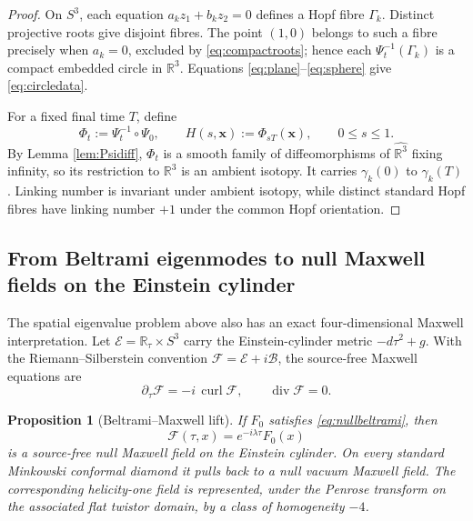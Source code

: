 \documentclass[aps,prd,reprint,nofootinbib,superscriptaddress]{revtex4-2}
\newtheorem{proposition}[theorem]{Proposition}
\theoremstyle{definition}
\theoremstyle{remark}
\newcommand{\R}{\mathbb{R}}
\newcommand{\Div}{\operatorname{div}}
\newcommand{\Curl}{\operatorname{curl}}
\begin{document}
\begin{proof}
On $S^3$, each equation $a_kz_1+b_kz_2=0$ defines a Hopf fibre $\Gamma_k$. Distinct projective roots give disjoint fibres. The point $(1,0)$ belongs to such a fibre precisely when $a_k=0$, excluded by \eqref{eq:compactroots}; hence each $\Psi_t^{-1}(\Gamma_k)$ is a compact embedded circle in $\R^3$. Equations \eqref{eq:plane}--\eqref{eq:sphere} give \eqref{eq:circledata}.

For a fixed final time $T$, define
\begin{equation}
\Phi_t:=\Psi_t^{-1}\circ\Psi_0,
\qquad
H(s,\mathbf x):=\Phi_{sT}(\mathbf x),
\qquad 0\le s\le1.
\label{eq:ambient}
\end{equation}
By Lemma \ref{lem:Psidiff}, $\Phi_t$ is a smooth family of diffeomorphisms of $\widehat{\R^3}$ fixing infinity, so its restriction to $\R^3$ is an ambient isotopy. It carries $\gamma_k(0)$ to $\gamma_k(T)$. Linking number is invariant under ambient isotopy, while distinct standard Hopf fibres have linking number $+1$ under the common Hopf orientation.
\end{proof}


\subsection{From Beltrami eigenmodes to null Maxwell fields on the Einstein cylinder}
\label{subsec:beltramiMaxwell}

The spatial eigenvalue problem above also has an exact four-dimensional Maxwell interpretation.  Let
\(\mathcal E=\mathbb R_\tau\times S^3\) carry the Einstein-cylinder metric
\(-d\tau^2+g\).  With the Riemann--Silberstein convention
\(\mathcal F=\mathcal E+i\mathcal B\), the source-free Maxwell equations are
\begin{equation}
 \partial_\tau\mathcal F=-i\,\Curl\mathcal F,
 \qquad \Div\mathcal F=0.
\label{eq:RSMaxwellCylinder}
\end{equation}

\begin{proposition}[Beltrami--Maxwell lift]
\label{prop:BeltramiMaxwellLift}
If $F_0$ satisfies \eqref{eq:nullbeltrami}, then
\begin{equation}
 \mathcal F(\tau,x)=e^{-i\lambda\tau}F_0(x)
\label{eq:BeltramiMaxwellLift}
\end{equation}
is a source-free null Maxwell field on the Einstein cylinder.  On every standard Minkowski conformal diamond it pulls back to a null vacuum Maxwell field.  The corresponding helicity-one field is represented, under the Penrose transform on the associated flat twistor domain, by a class of homogeneity $-4$.
\end{proposition}
\end{document}

